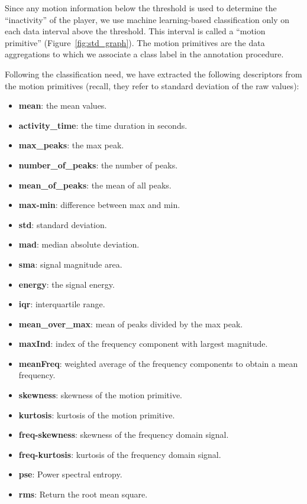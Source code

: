 Since any motion information below the threshold is used to determine the ``inactivity'' of the player, we use machine learning-based classification only on each data interval above the threshold. This interval is called a ``motion primitive'' (Figure~\ref{fig:std_graph}). The motion primitives are the data aggregations to which we associate a class label in the annotation procedure. 

Following the classification need, we have extracted the following descriptors from the motion primitives (recall, they refer to standard deviation of the raw values): 

\begin{itemize}
\item \textbf{mean}:  the mean values.
\item \textbf{activity\_time}: the time duration in seconds.
\item \textbf{max\_peaks}:  the max peak.
\item \textbf{number\_of\_peaks}:  the number of peaks.
\item \textbf{mean\_of\_peaks}: the mean of all peaks.
\item \textbf{max-min}: difference between max and min.
\item \textbf{std}: standard deviation.
\item \textbf{mad}: median absolute deviation.
\item \textbf{sma}: signal magnitude area.
\item \textbf{energy}: the signal energy.
\item \textbf{iqr}: interquartile range.
\item \textbf{mean\_over\_max}: mean of peaks divided by the max peak.
\item \textbf{maxInd}: index of the frequency component with largest magnitude.
\item \textbf{meanFreq}:  weighted average of the frequency components to obtain a mean frequency.
\item \textbf{skewness}:  skewness of the motion primitive.
\item \textbf{kurtosis}:  kurtosis of the motion primitive.
\item \textbf{freq-skewness}: skewness of the frequency domain signal.
\item \textbf{freq-kurtosis}: kurtosis of the frequency domain signal.
\item \textbf{pse}: Power spectral entropy.
\item \textbf{rms}: Return the root mean square.
\end{itemize}

